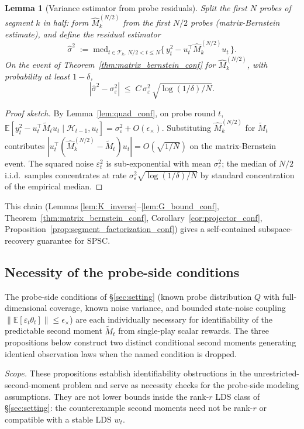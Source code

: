 \documentclass{article}
\newcommand{\E}{\mathbb{E}}
\newcommand{\cH}{\mathcal{H}}
\newcommand{\cT}{\mathcal{T}}
\newtheorem{lemma}[theorem]{Lemma}
\begin{document}
\begin{lemma}[Variance estimator from probe residuals]
\label{lem:variance_estimator}
Split the first $N$ probes of segment $k$ in half: form
$\widehat M_k^{(N/2)}$ from the first $N/2$ probes (matrix-Bernstein
estimate), and define the residual estimator
\[
\widehat\sigma^2 \;:=\; \mathrm{med}_{t\in\cT_k,\,N/2<t\le N}
  \bigl\{\,y_t^2 - u_t^\top \widehat M_k^{(N/2)} u_t\,\bigr\}.
\]
On the event of Theorem~\ref{thm:matrix_bernstein_conf} for
$\widehat M_k^{(N/2)}$, with probability at least $1-\delta$,
\[
|\widehat\sigma^2 - \sigma_\varepsilon^2|
\;\le\; C\,\sigma_\varepsilon^2\,\sqrt{\log(1/\delta)/N}.
\]
\end{lemma}
\begin{proof}[Proof sketch]
By Lemma~\ref{lem:quad_conf}, on probe round $t$,
$\E[y_t^2-u_t^\top\widetilde M_t u_t\mid\cH_{t-1},u_t]=\sigma_\varepsilon^2
+ O(\epsilon_\times)$. Substituting
$\widehat M_k^{(N/2)}$ for $\widetilde M_t$ contributes
$|u_t^\top(\widehat M_k^{(N/2)}-\widetilde M_t)u_t|=O(\sqrt{1/N})$ on
the matrix-Bernstein event. The squared noise $\varepsilon_t^2$ is
sub-exponential with mean $\sigma_\varepsilon^2$; the median of
$N/2$ i.i.d.\ samples concentrates at rate
$\sigma_\varepsilon^2\sqrt{\log(1/\delta)/N}$ by standard
concentration of the empirical median.
\end{proof}

This chain (Lemmas \ref{lem:K_inverse}--\ref{lem:G_bound_conf},
Theorem~\ref{thm:matrix_bernstein_conf}, Corollary~\ref{cor:projector_conf},
Proposition~\ref{prop:segment_factorization_conf}) gives a
self-contained subspace-recovery guarantee for SPSC.

\subsection{Necessity of the probe-side conditions}
\label{app:necessity}

The probe-side conditions of \S\ref{sec:setting} (known probe
distribution $Q$ with full-dimensional coverage, known noise
variance, and bounded state-noise coupling
$\|\E[\varepsilon_t\theta_t]\|\le\epsilon_\times$) are each
individually necessary for identifiability of the predictable second
moment $\widetilde M_t$ from single-play scalar rewards. The three
propositions below construct two distinct conditional second moments
generating identical observation laws when the named condition is
dropped.

\emph{Scope.} These propositions establish identifiability
obstructions in the unrestricted-second-moment problem and serve as
necessity checks for the probe-side modeling assumptions. They are not
lower bounds inside the rank-$r$ LDS class of \S\ref{sec:setting}:
the counterexample second moments need not be rank-$r$ or compatible
with a stable LDS $w_t$.
\end{document}
